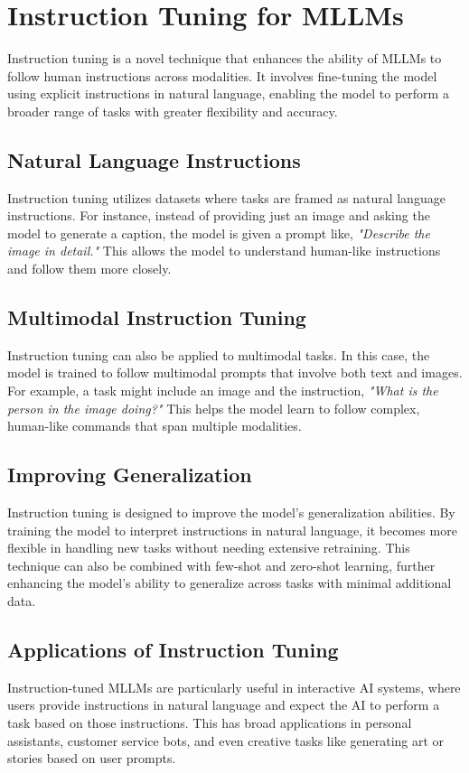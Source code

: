 \section{Instruction Tuning for MLLMs}

Instruction tuning is a novel technique that enhances the ability of MLLMs to follow human instructions across modalities. It involves fine-tuning the model using explicit instructions in natural language, enabling the model to perform a broader range of tasks with greater flexibility and accuracy.

\subsection{Natural Language Instructions}

Instruction tuning utilizes datasets where tasks are framed as natural language instructions. For instance, instead of providing just an image and asking the model to generate a caption, the model is given a prompt like, \textit{"Describe the image in detail."} This allows the model to understand human-like instructions and follow them more closely.

\subsection{Multimodal Instruction Tuning}

Instruction tuning can also be applied to multimodal tasks. In this case, the model is trained to follow multimodal prompts that involve both text and images. For example, a task might include an image and the instruction, \textit{"What is the person in the image doing?"} This helps the model learn to follow complex, human-like commands that span multiple modalities.

\subsection{Improving Generalization}

Instruction tuning is designed to improve the model’s generalization abilities. By training the model to interpret instructions in natural language, it becomes more flexible in handling new tasks without needing extensive retraining. This technique can also be combined with few-shot and zero-shot learning, further enhancing the model’s ability to generalize across tasks with minimal additional data.

\subsection{Applications of Instruction Tuning}

Instruction-tuned MLLMs are particularly useful in interactive AI systems, where users provide instructions in natural language and expect the AI to perform a task based on those instructions. This has broad applications in personal assistants, customer service bots, and even creative tasks like generating art or stories based on user prompts.


